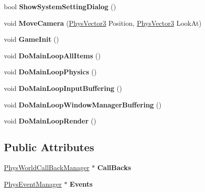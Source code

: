 \begin{DoxyCompactItemize}
\item 
\hypertarget{classPhysWorld_a9b83f04907443c6307956a3c4089e3ca}{
bool {\bfseries ShowSystemSettingDialog} ()}
\label{db/df5/classPhysWorld_a9b83f04907443c6307956a3c4089e3ca}

\item 
\hypertarget{classPhysWorld_a1df24ee06d5881825902b60e0d81174a}{
void {\bfseries MoveCamera} (\hyperlink{classPhysVector3}{PhysVector3} Position, \hyperlink{classPhysVector3}{PhysVector3} LookAt)}
\label{db/df5/classPhysWorld_a1df24ee06d5881825902b60e0d81174a}

\item 
\hypertarget{classPhysWorld_a6d65a7412c1711497fbd1173f879243a}{
void {\bfseries GameInit} ()}
\label{db/df5/classPhysWorld_a6d65a7412c1711497fbd1173f879243a}

\item 
\hypertarget{classPhysWorld_a60b7978b39fc347c2f37077737783da6}{
void {\bfseries DoMainLoopAllItems} ()}
\label{db/df5/classPhysWorld_a60b7978b39fc347c2f37077737783da6}

\item 
\hypertarget{classPhysWorld_a994d7d8c4a9a0c003c3e7d89be7b399b}{
void {\bfseries DoMainLoopPhysics} ()}
\label{db/df5/classPhysWorld_a994d7d8c4a9a0c003c3e7d89be7b399b}

\item 
\hypertarget{classPhysWorld_a81b3f0dcc0a90d039623f696343e6e9c}{
void {\bfseries DoMainLoopInputBuffering} ()}
\label{db/df5/classPhysWorld_a81b3f0dcc0a90d039623f696343e6e9c}

\item 
\hypertarget{classPhysWorld_ae81bab7f314d98f7b787c508e60c9c9a}{
void {\bfseries DoMainLoopWindowManagerBuffering} ()}
\label{db/df5/classPhysWorld_ae81bab7f314d98f7b787c508e60c9c9a}

\item 
\hypertarget{classPhysWorld_a8f33541d67164a2452e568443e9905be}{
void {\bfseries DoMainLoopRender} ()}
\label{db/df5/classPhysWorld_a8f33541d67164a2452e568443e9905be}

\end{DoxyCompactItemize}
\subsection*{Public Attributes}
\begin{DoxyCompactItemize}
\item 
\hypertarget{classPhysWorld_a080ea6f1584374b07d3c1f29c7ed64df}{
\hyperlink{classPhysWorldCallBackManager}{PhysWorldCallBackManager} $\ast$ {\bfseries CallBacks}}
\label{db/df5/classPhysWorld_a080ea6f1584374b07d3c1f29c7ed64df}

\item 
\hypertarget{classPhysWorld_a601b3c6093aaf2a69fcd3311dde9aadc}{
\hyperlink{classPhysEventManager}{PhysEventManager} $\ast$ {\bfseries Events}}
\label{db/df5/classPhysWorld_a601b3c6093aaf2a69fcd3311dde9aadc}

\end{DoxyCompactItemize}
